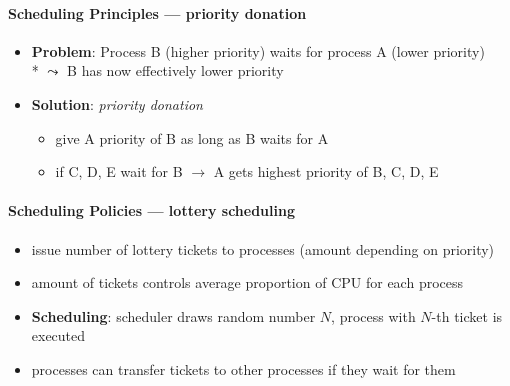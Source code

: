 \paragraph{Scheduling Principles --- priority donation}
\begin{itemize}
  \item \textbf{Problem}: Process B (higher priority) waits for process A (lower priority) \\*
    \( \leadsto \) B has now effectively lower priority
  \item \textbf{Solution}: \emph{priority donation}
  \begin{itemize}
    \item give A priority of B as long as B waits for A
    \item if C, D, E wait for B \( \to \) A gets highest priority of B, C, D, E
  \end{itemize}
\end{itemize}

\paragraph{Scheduling Policies --- lottery scheduling}
\begin{itemize}
  \item issue number of lottery tickets to processes (amount depending on priority)
  \item amount of tickets controls average proportion of CPU for each process
  \item \textbf{Scheduling}: scheduler draws random number \( N \), process with \( N \)-th ticket is executed
  \item processes can transfer tickets to other processes if they wait for them
\end{itemize}

